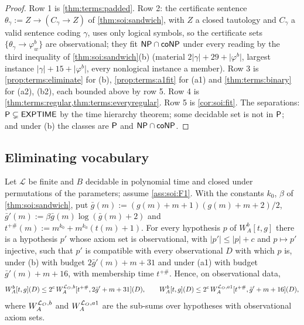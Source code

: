 \begin{proof}
Row 1 is \cref{thm:terms:padded}. Row 2: the certificate sentence $\theta_\gamma:=Z\to(C_\gamma\to Z)$ of \cref{thm:soi:sandwich}, with $Z$ a closed tautology and $C_\gamma$ a valid sentence coding $\gamma$, uses only logical symbols, so the certificate sets $\{\theta_\gamma\to\varphi_w^b\}$ are observational; they fit $\mathsf{NP}\cap\mathsf{coNP}$ under every reading by the third inequality of \cref{thm:soi:sandwich}(b) (material $2\lvert\gamma\rvert+29+\lvert\varphi^b\rvert$, largest instance $\lvert\gamma\rvert+15+\lvert\varphi^b\rvert$, every nonlogical instance a member). Row 3 is \cref{prop:terms:eliminate} for (b), \cref{prop:terms:a1fit} for (a1) and \cref{thm:terms:binary} for (a2), (b2), each bounded above by row 5. Row 4 is \cref{thm:terms:regular,thm:terms:everyregular}. Row 5 is \cref{cor:soi:fit}. The separations: $\mathsf{P}\subsetneq\mathsf{EXPTIME}$ by the time hierarchy theorem; some decidable set is not in $\mathsf{P}$; and under (b) the classes are $\mathsf{P}$ and $\mathsf{NP}\cap\mathsf{coNP}$.
\end{proof}

\subsection{Eliminating vocabulary}\label{app:terms:eliminate}

\begin{proposition}\label{prop:terms:eliminate}
Let $\mathcal L$ be finite and $B$ decidable in polynomial time and closed under permutations of the parameters; assume \cref{ass:soi:F1}. With the constants $k_0$, $\beta$ of \cref{thm:soi:sandwich}, put $\bar g(m):=(g(m)+m+1)(g(m)+m+2)/2$, $\bar g'(m):=\beta\bar g(m)\log(\bar g(m)+2)$ and $t^{+\#}(m):=m^{k_0}+m^{k_0}(t(m)+1)$. For every hypothesis $p$ of $W_A^{b}[t,g]$ there is a hypothesis $p'$ whose axiom set is observational, with $\lvert p'\rvert\le\lvert p\rvert+c$ and $p\mapsto p'$ injective, such that $p'$ is compatible with every observational $D$ with which $p$ is, under (b) with budget $2\bar g'(m)+m+31$ and under (a1) with budget $\bar g'(m)+m+16$, with membership time $t^{+\#}$. Hence, on observational data,
\[
W_A^{b}[t,g](D)\le2^c\,W_A^{\mathcal{L}_{O},b}[t^{+\#},2\bar g'+m+31](D),\qquad W_A^{b}[t,g](D)\le2^c\,W_A^{\mathcal{L}_{O},a1}[t^{+\#},\bar g'+m+16](D),
\]
where $W_A^{\mathcal{L}_{O},b}$ and $W_A^{\mathcal{L}_{O},a1}$ are the sub-sums over hypotheses with observational axiom sets.
\end{proposition}

